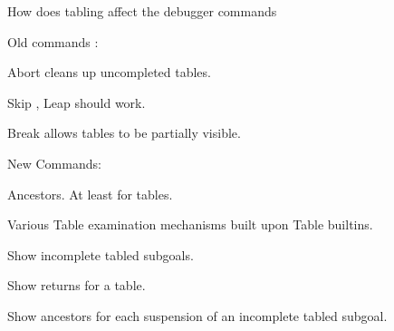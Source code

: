 How does tabling affect the debugger commands

Old commands : 

Abort cleans up uncompleted tables.

Skip , Leap should work.

Break allows tables to be partially visible.


New Commands: 

Ancestors.  At least for tables.

Various Table examination mechanisms built upon Table builtins.

Show incomplete tabled subgoals.

Show returns for a table.

Show ancestors for each suspension of an incomplete tabled subgoal.

